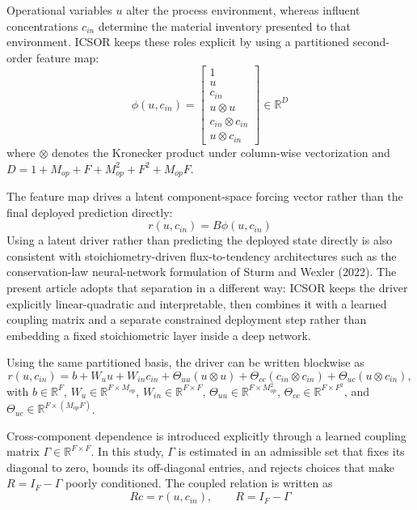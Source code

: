 \documentclass[11pt]{article}
\begin{document}
Operational variables $u$ alter the process environment, whereas influent concentrations $c_{in}$ determine the material inventory presented to that environment. ICSOR keeps these roles explicit by using a partitioned second-order feature map:
\begin{equation}
\phi(u, c_{in}) = \begin{bmatrix}
1 \\
 u \\
 c_{in} \\
 u \otimes u \\
 c_{in} \otimes c_{in} \\
 u \otimes c_{in}
\end{bmatrix} \in \mathbb{R}^{D}
\end{equation}
where $\otimes$ denotes the Kronecker product under column-wise vectorization and $D = 1 + M_{op} + F + M_{op}^2 + F^2 + M_{op}F$.

The feature map drives a latent component-space forcing vector rather than the final deployed prediction directly:
\begin{equation}
 r(u, c_{in}) = B \phi(u, c_{in})
\end{equation}
Using a latent driver rather than predicting the deployed state directly is also consistent with stoichiometry-driven flux-to-tendency architectures such as the conservation-law neural-network formulation of Sturm and Wexler (2022). The present article adopts that separation in a different way: ICSOR keeps the driver explicitly linear-quadratic and interpretable, then combines it with a learned coupling matrix and a separate constrained deployment step rather than embedding a fixed stoichiometric layer inside a deep network.

Using the same partitioned basis, the driver can be written blockwise as
\[
 r(u, c_{in}) = b + W_u u + W_{in} c_{in} + \Theta_{uu}(u \otimes u) + \Theta_{cc}(c_{in} \otimes c_{in}) + \Theta_{uc}(u \otimes c_{in}),
\]
with $b \in \mathbb{R}^{F}$, $W_u \in \mathbb{R}^{F \times M_{op}}$, $W_{in} \in \mathbb{R}^{F \times F}$, $\Theta_{uu} \in \mathbb{R}^{F \times M_{op}^2}$, $\Theta_{cc} \in \mathbb{R}^{F \times F^2}$, and $\Theta_{uc} \in \mathbb{R}^{F \times (M_{op}F)}$.

Cross-component dependence is introduced explicitly through a learned coupling matrix $\Gamma \in \mathbb{R}^{F \times F}$. In this study, $\Gamma$ is estimated in an admissible set that fixes its diagonal to zero, bounds its off-diagonal entries, and rejects choices that make $R = I_F - \Gamma$ poorly conditioned. The coupled relation is written as
\begin{equation}
 R c = r(u, c_{in}), \qquad R = I_F - \Gamma
\end{equation}
\end{document}
